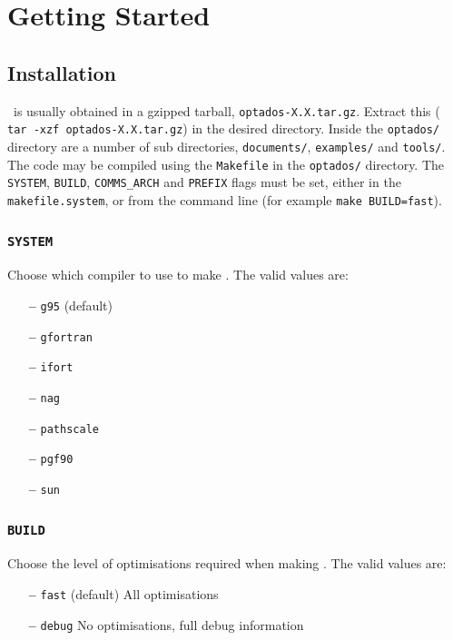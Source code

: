 \documentclass[a4paper,11pt,twoside]{book}
\begin{document}
{\chapter{Getting Started}\label{chap:getting_started}
\section{Installation}
\optados\ is usually obtained in a gzipped tarball, \verb#optados-X.X.tar.gz#. Extract this ( \verb# tar -xzf optados-X.X.tar.gz#) in the desired directory. Inside the  \verb#optados/# directory are a number of sub directories,  \verb#documents/#,   \verb#examples/# and \verb#tools/#.  The code may be compiled using the \verb#Makefile# in the  \verb#optados/# directory.  The \verb#SYSTEM#, \verb#BUILD#, \verb#COMMS_ARCH# and \verb#PREFIX# flags must be set, either in the  \verb#makefile.system#, or from the command line (for example  \verb#make BUILD=fast#).  

\subsection[system]{\tt SYSTEM}

Choose which compiler to use to make \optados. The valid values are:
\begin{itemize}
\item[{\bf --}]  \verb#g95# (default)
\item[{\bf --}]  \verb#gfortran#
\item[{\bf --}]  \verb#ifort#
\item[{\bf --}]  \verb#nag#
\item[{\bf --}]  \verb#pathscale#
\item[{\bf --}]  \verb#pgf90#
\item[{\bf --}]  \verb#sun#
\end{itemize}

\subsection[build]{\tt BUILD}

Choose the level of optimisations required when making \optados.  The valid values are:
\begin{itemize}
\item[{\bf --}]  \verb#fast# (default) All optimisations
\item[{\bf --}]  \verb#debug# No optimisations, full debug information
\end{itemize}

}
\end{document}
